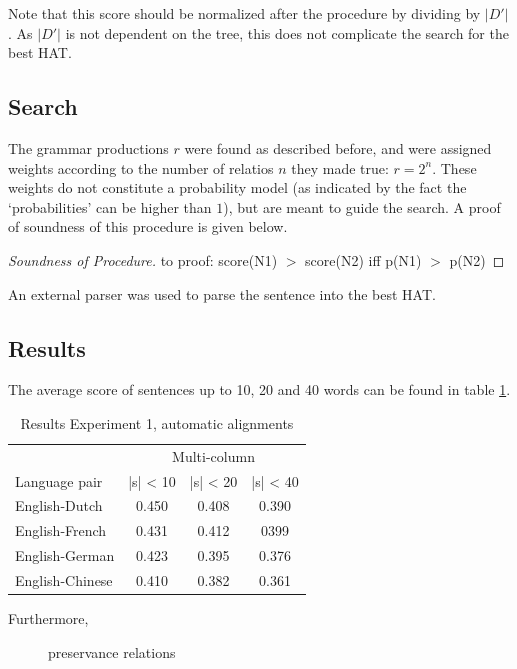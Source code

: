 \documentclass[a4paper, 11pt]{report}
\theoremstyle{definition}
\theoremstyle{plain}
\begin{document}
Note that this score should be normalized after the procedure by dividing by $|D'|$. As $|D'|$ is not dependent on the tree, this does not complicate the search for the best HAT.

\subsection{Search}

The grammar productions $r$ were found as described before, and were assigned weights according to the number of relatios $n$ they made true: $r = 2^n$. These weights do not constitute a probability model (as indicated by the fact the `probabilities' can be higher than $1$), but are meant to guide the search. A proof of soundness of this procedure is given below.

\begin{proof}[Soundness of Procedure]
\label{proof:s1}
to proof: score(N1) $>$ score(N2) iff p(N1) $>$ p(N2)
\end{proof}

An external parser was used \citep{bird2009natural} to parse the sentence into the best HAT.

\subsection{Results}

The average score of sentences up to 10, 20 and 40 words can be found in table \ref{tab:scores1}.

\begin{table}[!h]
\centering
\begin{tabular}{l|ccc}
& \multicolumn{3}{c}{Multi-column}\\
Language pair & |s| < 10 & |s| < 20 & |s| < 40\\
\hline
English-Dutch & 0.450 & 0.408 & 0.390 \\
English-French & 0.431 & 0.412 & 0399 \\
English-German & 0.423 & 0.395 & 0.376 \\
English-Chinese & 0.410 & 0.382 & 0.361\\
\end{tabular}
\caption{Results Experiment 1, automatic alignments}\label{tab:scores1}
\end{table}

Furthermore,  
 
\begin{figure}
\caption{preservance relations}\label{fig:relpreservation}
\end{figure}
\end{document}
